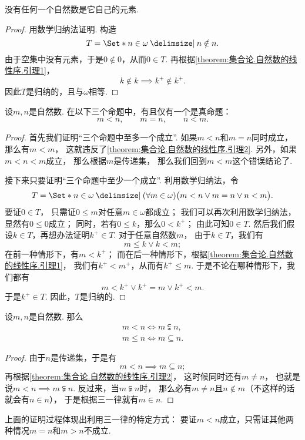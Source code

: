 \begin{lemma}\label{theorem:集合论.自然数的线性序.引理2}
没有任何一个自然数是它自己的元素.
\begin{proof}
用数学归纳法证明.
构造\[
	T = \Set*{ n \in \omega \given n \notin n }.
\]
由于空集中没有元素，于是\(0 \notin 0\)，从而\(0 \in T\).
再根据\cref{theorem:集合论.自然数的线性序.引理1}，\[
	k \notin k
	\implies
	k^+ \notin k^+.
\]
因此\(T\)是归纳的，且与\(\omega\)相等.
\end{proof}
\end{lemma}

\begin{theorem}\label{theorem:集合论.自然数集的三一律}
设\(m,n\)是自然数.
在以下三个命题中，有且仅有一个是真命题：\[
	m < n, \qquad
	m = n, \qquad
	n < m.
\]
\begin{proof}
首先我们证明“三个命题中至多一个成立”.
如果\(m < n\)和\(m = n\)同时成立，
那么有\(m < m\)，
这就违反了\cref{theorem:集合论.自然数的线性序.引理2}.
另外，如果\(m < n < m\)成立，
那么根据\(m\)是传递集，
那么我们回到\(m < m\)这个错误结论了.

接下来只要证明“三个命题中至少一个成立”.
利用数学归纳法，令\[
	T = \Set*{
		n \in \omega
		\given
		(\forall m \in \omega)
		\bigl(
			m < n
			\lor
			m = n
			\lor
			n < m
		\bigr)
	}.
\]
要证\(0 \in T\)，
只需证\(0 \leqslant m\)对任意\(m \in \omega\)都成立；
我们可以再次利用数学归纳法，
显然有\(0 \leqslant 0\)成立；
同时，若有\(0 \leqslant k\)，那么\(0 < k^+\)；
由此可知\(0 \in T\).
然后我们假设\(k \in T\)，再想办法证明\(k^+ \in T\).
对于任意自然数\(m\)，
由于\(k \in T\)，我们有\[
	m \leqslant k
	\lor
	k < m;
\]
在前一种情形下，有\(m < k^+\)；
而在后一种情形下，根据\cref{theorem:集合论.自然数的线性序.引理1}，
我们有\(k^+ < m^+\)，从而有\(k^+ \leqslant m\).
于是不论在哪种情形下，我们都有\[
	m < k^+
	\lor
	k^+ = m
	\lor
	k^+ < m.
\]
于是\(k^+ \in T\).
因此，\(T\)是归纳的.
\end{proof}
\end{theorem}

\begin{corollary}
设\(m,n\)是自然数.
那么\begin{gather*}
	m < n \iff m \subsetneqq n, \\
	m \leqslant n \iff m \subseteq n.
\end{gather*}
\begin{proof}
由于\(n\)是传递集，于是有\[
	m < n \implies m \subseteq n;
\]
再根据\cref{theorem:集合论.自然数的线性序.引理2}，
这时候同时还有\(m \neq n\)，
也就是说\(m < n \implies m \subsetneqq n\).
反过来，当\(m \subsetneqq n\)时，
那么必有\(m \neq n\)且\(n \notin m\)（不这样的话就会有\(n \in n\)），
于是根据三一律就有\(m \in n\).
\end{proof}
\end{corollary}
上面的证明过程体现出利用三一律的特定方式：
要证\(m < n\)成立，只需证其他两种情况\(m = n\)和\(m > n\)不成立.

